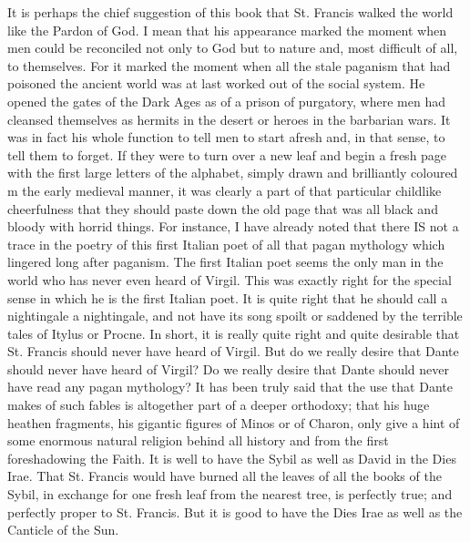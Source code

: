 \documentclass{book}
\begin{document}
It is perhaps the chief suggestion of this book that St. Francis walked the world like the Pardon of God. I mean that his appearance marked the moment when men could be reconciled not only to God but to nature and, most difficult of all, to themselves. For it marked the moment when all the stale paganism that had poisoned the ancient world was at last worked out of the social system. He opened the gates of the Dark Ages as of a prison of purgatory, where men had cleansed themselves as hermits in the desert or heroes in the barbarian wars. It was in fact his whole function to tell men to start afresh and, in that sense, to tell them to forget. If they were to turn over a new leaf and begin a fresh page with the first large letters of the alphabet, simply drawn and brilliantly coloured m the early medieval manner, it was clearly a part of that particular childlike cheerfulness that they should paste down the old page that was all black and bloody with horrid things. For instance, I have already noted that there IS not a trace in the poetry of this first Italian poet of all that pagan mythology which lingered long after paganism. The first Italian poet seems the only man in the world who has never even heard of Virgil. This was exactly right for the special sense in which he is the first Italian poet. It is quite right that he should call a nightingale a nightingale, and not have its song spoilt or saddened by the terrible tales of Itylus or Procne. In short, it is really quite right and quite desirable that St. Francis should never have heard of Virgil. But do we really desire that Dante should never have heard of Virgil? Do we really desire that Dante should never have read any pagan mythology? It has been truly said that the use that Dante makes of such fables is altogether part of a deeper orthodoxy; that his huge heathen fragments, his gigantic figures of Minos or of Charon, only give a hint of some enormous natural religion behind all history and from the first foreshadowing the Faith. It is well to have the Sybil as well as David in the Dies Irae. That St. Francis would have burned all the leaves of all the books of the Sybil, in exchange for one fresh leaf from the nearest tree, is perfectly true; and perfectly proper to St. Francis. But it is good to have the Dies Irae as well as the Canticle of the Sun.
\end{document}
